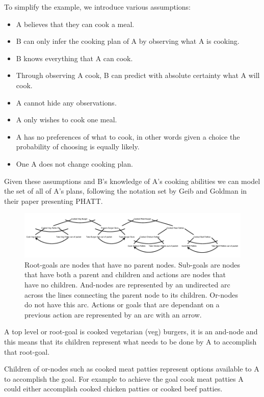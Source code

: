 \documentclass[parskip]{cs4rep}
\begin{document}
To simplify the example, we introduce various assumptions:

\begin{itemize}
\item
A believes that they can cook a meal.
\item
B can only infer the cooking plan of A by observing what A is cooking.
\item
B knows everything that A can cook.
\item
Through observing A cook, B can predict with absolute certainty what A will cook.
\item
A cannot hide any observations.
\item
A only wishes to cook one meal.
\item
A has no preferences of what to cook, in other words given a choice the probability of choosing is equally likely.
\item
One A does not change cooking plan.
\end{itemize}

Given these assumptions and B's knowledge of A's cooking abilities we can model the set of all of A's plans, following the notation set by Geib and Goldman in their paper presenting PHATT.

\begin{figure}[h]
\centering
\includegraphics{images/example-plan-recognition}
\caption{Root-goals are nodes that have no parent nodes. Sub-goals are nodes that have both a parent and children and actions are nodes that have no children. And-nodes are represented by an undirected arc across the lines connecting the parent node to its children. Or-nodes do not have this arc. Actions or goals that are dependant on a previous action are represented by an arc with an arrow.}
\label{fig:example-plan-library}
\end{figure} 

A top level or root-goal is cooked vegetarian (veg) burgers, it is an and-node and this means that its children represent what needs to be done by A to accomplish that root-goal. 

Children of or-nodes such as cooked meat patties represent options available to A to accomplish the goal. For example to achieve the goal cook meat patties A could either accomplish cooked chicken patties or cooked beef patties.
\end{document}
